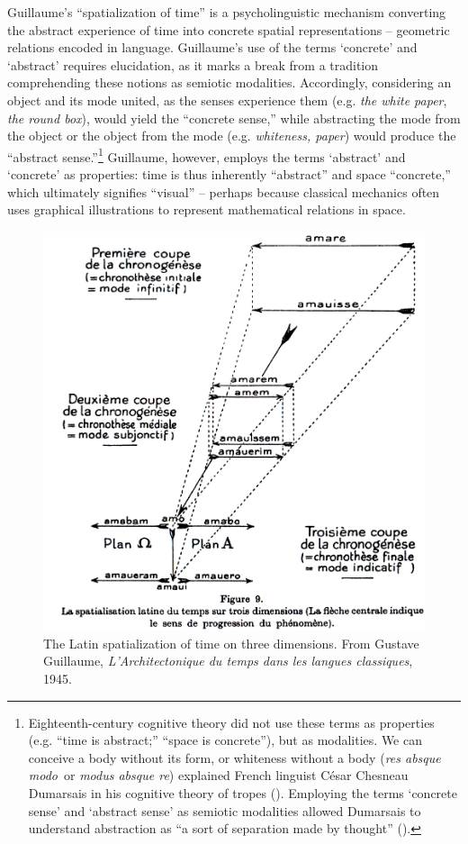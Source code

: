 \documentclass[output=paper]{langsci/langscibook}
\begin{document}
Guillaume’s “spatialization of time” is a psycholinguistic mechanism converting the abstract experience of time into concrete spatial representations -- geometric relations encoded in language. Guillaume’s use of the terms ‘concrete’ and ‘abstract’ requires elucidation, as it marks a break from a tradition comprehending these notions as semiotic modalities. Accordingly, considering an object and its mode united, as the senses experience them (e.g. \textit{the white paper}, \textit{the round box}), would yield the “concrete sense,” while abstracting the mode from the object or the object from the mode (e.g. \textit{whiteness, paper}) would produce the “abstract sense.”\footnote{Eighteenth-century cognitive theory did not use these terms as properties (e.g. “time is abstract;” “space is concrete”), but as modalities. We can conceive a body without its form, or whiteness without a body (\textit{res absque modo}~or \textit{modus absque re}) explained French linguist César Chesneau Dumarsais in his cognitive theory of tropes (\citeyear{dumarsais_tropes_1730}). Employing the terms ‘concrete sense’ and ‘abstract sense’ as semiotic modalities allowed Dumarsais to understand abstraction as “a sort of separation made by thought” (\citeyear[260]{dumarsais_tropes_1730}).} Guillaume, however, employs the terms ‘abstract’ and ‘concrete’ as properties: time is thus inherently “abstract” and space “concrete,” which ultimately signifies “visual” -- perhaps because classical mechanics often uses graphical illustrations to represent mathematical relations in space.

\begin{figure}
\includegraphics[width=.75\textwidth]{figures/03/Ch3Fig1.png}
\caption{The Latin spatialization of time on three dimensions. From Gustave Guillaume, \textit{L'Architectonique du temps dans les langues classiques}, 1945. 
\citealt[37]{guillaume_larchitectonique_1965}\label{fig:3:1}}
\end{figure}
\end{document}
